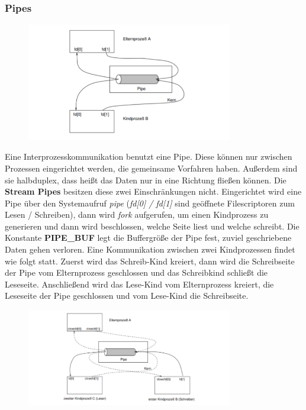 \documentclass{article}
\begin{document}
\subsubsection{Pipes}
    \begin{figure}[H]
        \centering
	    \includegraphics[width=90mm]{Skizzen/4_Kapitel/pipeaufbau.png}
    \end{figure}\newline
    Eine Interprozesskommunikation benutzt eine Pipe. Diese können nur zwischen Prozessen eingerichtet werden, die gemeinsame Vorfahren haben. Außerdem sind sie halbduplex, dass heißt das Daten nur in eine Richtung fließen können. Die \textbf{Stream Pipes} besitzen diese zwei Einschränkungen nicht.\newline
    Eingerichtet wird eine Pipe über den Systemaufruf \textit{pipe} (\textit{fd[0] / fd[1]} sind geöffnete Filescriptoren zum Lesen / Schreiben), dann wird \textit{fork} aufgerufen, um einen Kindprozess zu generieren und dann wird beschlossen, welche Seite liest und welche schreibt.\newline
    Die Konstante \textbf{PIPE_BUF} legt die Buffergröße der Pipe fest, zuviel geschriebene Daten gehen verloren.\newline
    Eine Kommunikation zwischen zwei Kindprozessen findet wie folgt statt. Zuerst wird das Schreib-Kind kreiert, dann wird die Schreibseite der Pipe vom Elternprozess geschlossen und das Schreibkind schließt die Leseseite. Anschließend wird das Lese-Kind vom Elternprozess kreiert, die Leseseite der Pipe geschlossen und vom Lese-Kind die Schreibseite.\newline
    \begin{figure}[H]
        \centering
	    \includegraphics[width=90mm]{Skizzen/4_Kapitel/komm_zwei_kind.png}
    \end{figure}
\end{document}
